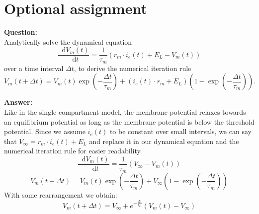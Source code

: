 \documentclass{scrartcl}
\newcommand*\diff{\mathop{}\!\mathrm{d}}
\newcommand\Question{%
  \textbf{Question:}%
}
\newcommand\Answer{%
  \textbf{Answer:}%
}
\begin{document}
\section{Optional assignment}

\Question\\
Analytically solve the dynamical equation 
\begin{equation*}
\frac{\diff V_m(t)}{\diff t} = \frac{1}{\tau_m}\left( r_m \cdot i_e(t) + E_L - V_m(t)\right)
\end{equation*}
over a time interval $\Delta t$, to derive the numerical iteration rule
\begin{equation*}
V_m(t+\Delta t) = V_m(t) \exp\left(-\frac{\Delta t}{\tau_m}\right) + \left(i_e(t) \cdot r_m + E_L \right) \left( 1 - \exp{\left( -\frac{\Delta t}{\tau_m}\right)}\right).
\end{equation*}

\Answer\\
Like in the single compartment model, the membrane potential relaxes towards an equilibrium potential as long as the membrane potential is below the threshold potential. Since we assume $i_e(t)$ to be constant over small intervals, we can say that $V_\infty = r_m \cdot i_e(t) + E_L$ and replace it in our dynamical equation and the numerical iteration rule for easier readability.
\begin{equation*}
\frac{\diff V_m(t)}{\diff t} = \frac{1}{\tau_m}\left( V_\infty - V_m(t)\right)
\end{equation*}
\begin{equation*}
V_m(t+\Delta t) = V_m(t) \exp\left(-\frac{\Delta t}{\tau_m}\right) + V_\infty \left( 1 - \exp{\left( -\frac{\Delta t}{\tau_m}\right)}\right)
\end{equation*}
With some rearrangement we obtain:
\begin{equation*}
V_m(t+\Delta t)= V_\infty + e^{-\frac{\Delta t}{\tau_m}}\left( V_m(t) -V_\infty\right)
\end{equation*}
\end{document}
